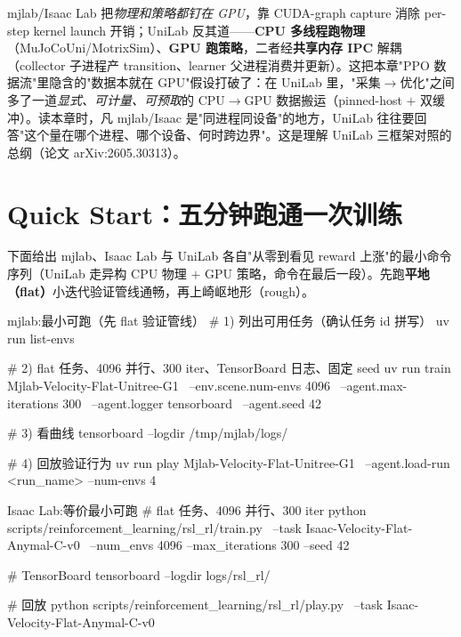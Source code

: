 \begin{insight}\label{ins:rlmc-unilab-heterogeneous-train}
mjlab/Isaac Lab 把\emph{物理和策略都钉在 GPU}，靠 CUDA-graph capture 消除 per-step kernel launch 开销；UniLab 反其道——\textbf{CPU 多线程跑物理}（MuJoCoUni/MotrixSim）、\textbf{GPU 跑策略}，二者经\textbf{共享内存 IPC} 解耦（collector 子进程产 transition、learner 父进程消费并更新）。这把本章"PPO 数据流"里隐含的"数据本就在 GPU"假设打破了：在 UniLab 里，"采集$\to$优化"之间多了一道\emph{显式、可计量、可预取}的 CPU$\to$GPU 数据搬运（pinned-host $+$ 双缓冲）。读本章时，凡 mjlab/Isaac 是"同进程同设备"的地方，UniLab 往往要回答"这个量在哪个进程、哪个设备、何时跨边界"。这是理解 UniLab 三框架对照的总纲（论文 arXiv:2605.30313）。
\end{insight}

\section*{Quick Start：五分钟跑通一次训练}
\label{sec:rlmc-train-quickstart}

下面给出 mjlab、Isaac Lab 与 UniLab 各自"从零到看见 reward 上涨"的最小命令序列（UniLab 走异构 CPU 物理 $+$ GPU 策略，命令在最后一段）。先跑\textbf{平地（flat）}小迭代验证管线通畅，再上崎岖地形（rough）。

\begin{codebox}[bash]{mjlab:最小可跑（先 flat 验证管线）}
# 1) 列出可用任务（确认任务 id 拼写）
uv run list-envs

# 2) flat 任务、4096 并行、300 iter、TensorBoard 日志、固定 seed
uv run train Mjlab-Velocity-Flat-Unitree-G1 \
  --env.scene.num-envs 4096 \
  --agent.max-iterations 300 \
  --agent.logger tensorboard \
  --agent.seed 42

# 3) 看曲线
tensorboard --logdir /tmp/mjlab/logs/

# 4) 回放验证行为
uv run play Mjlab-Velocity-Flat-Unitree-G1 \
  --agent.load-run <run_name> --num-envs 4
\end{codebox}

\begin{codebox}[bash]{Isaac Lab:等价最小可跑}
# flat 任务、4096 并行、300 iter
python scripts/reinforcement_learning/rsl_rl/train.py \
  --task Isaac-Velocity-Flat-Anymal-C-v0 \
  --num_envs 4096 --max_iterations 300 --seed 42

# TensorBoard
tensorboard --logdir logs/rsl_rl/

# 回放
python scripts/reinforcement_learning/rsl_rl/play.py \
  --task Isaac-Velocity-Flat-Anymal-C-v0
\end{codebox}

